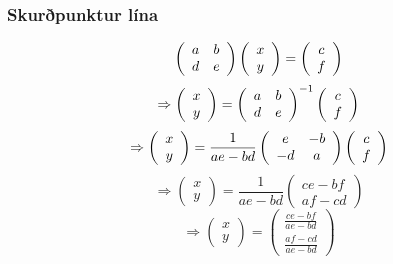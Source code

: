 \documentclass{beamer}
\newcommand\env[2]
{
	\begin{#1}
	#2
	\end{#1}
}
\begin{document}
\env{frame}
{
	\frametitle{Skurðpunktur lína}
		\[
			\left (
			\begin{array}{c c}
				a & b\\
				d & e
			\end{array}
			\right )
			\left (
			\begin{array}{c}
				x\\
				y
			\end{array}
			\right )
			=
			\left (
			\begin{array}{c}
				c\\
				f
			\end{array}
			\right )
		\]
			\pause 
		\[
			\Rightarrow
			\left (
			\begin{array}{c}
				x\\
				y
			\end{array}
			\right )
			=
			\left (
			\begin{array}{c c}
				a & b\\
				d & e
			\end{array}
			\right )^{-1}
			\left (
			\begin{array}{c}
				c\\
				f
			\end{array}
			\right )
		\]
			\pause 
		\[
			\Rightarrow
			\left (
			\begin{array}{c}
				x\\
				y
			\end{array}
			\right )
			=
			\frac{1}{ae - bd}
			\left (
			\begin{array}{c c}
				e & -b\\
				-d & a
			\end{array}
			\right )
			\left (
			\begin{array}{c}
				c\\
				f
			\end{array}
			\right )
		\]
			\pause 
		\[
			\Rightarrow
			\left (
			\begin{array}{c}
				x\\
				y
			\end{array}
			\right )
			=
			\frac{1}{ae - bd}
			\left (
			\begin{array}{c}
				ce - bf\\
				af - cd
			\end{array}
			\right )
		\]
			\pause 
		\[
			\Rightarrow
			\left (
			\begin{array}{c}
				x\\
				y
			\end{array}
			\right )
			=
			\left (
			\begin{array}{c}
			\frac{ce - bf}{ae - bd}\\
			\frac{af - cd}{ae - bd}
			\end{array}
			\right )
		\]
}
\end{document}
